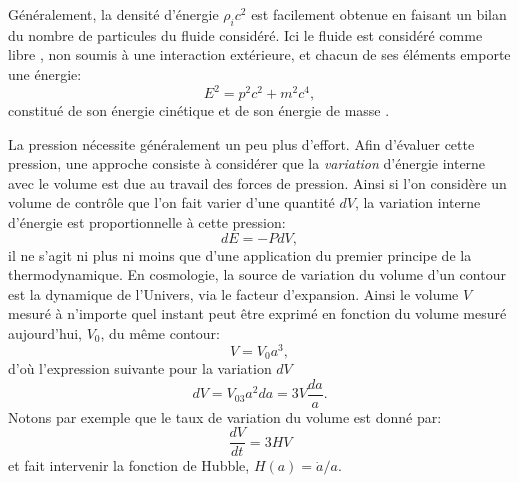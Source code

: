 Généralement, la densité d'énergie $\rho_i c^2$ est facilement obtenue en faisant un bilan du nombre de particules du fluide considéré. Ici le fluide est considéré comme libre , non soumis à une interaction extérieure, et chacun de ses éléments emporte une énergie:
\begin{equation}
E^2=p^2c^2+m^2c^4,
\end{equation}
constitué de son énergie cinétique et de son énergie de masse .

La pression nécessite généralement un peu plus d'effort. Afin d'évaluer cette pression, une approche consiste à considérer que la \textit{variation} d'énergie interne avec le volume est due au travail des forces de pression. Ainsi si l’on considère un volume de contrôle que l'on fait varier d'une quantité $dV$, la variation interne d'énergie est proportionnelle à cette pression:
\begin{equation}
dE=-PdV,
\label{e:therm1}
\end{equation}
il ne s'agit ni plus ni moins que d'une application du premier principe de la thermodynamique. En cosmologie, la source de variation du volume d'un contour est la dynamique de l'Univers, via le facteur d'expansion. Ainsi le volume $V$ mesuré à n'importe quel instant peut être exprimé en fonction du volume mesuré aujourd'hui, $V_0$, du même contour:
\begin{equation}
V=V_0a^3,
\end{equation}
d'où l'expression suivante pour la variation $dV$
\begin{equation}
dV=V_03a^2da=3V\frac{da}{a}.
\label{e:dV}
\end{equation}
Notons par exemple que le taux de variation du volume est donné par:
\begin{equation}
\frac{dV}{dt}=3HV
\end{equation}
et fait intervenir la fonction de Hubble, $H(a)=\dot a/a$.

